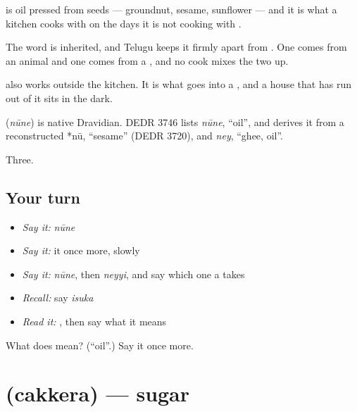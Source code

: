  is oil pressed from seeds — groundnut, sesame, sunflower — and it is what a kitchen cooks with on the days it is not cooking with .

The word is inherited, and Telugu keeps it firmly apart from . One comes from an animal and one comes from a , and no cook mixes the two up.

 also works outside the kitchen. It is what goes into a , and a house that has run out of it sits in the dark.

\begin{cousinweb}
\textbf{} (\emph{nūne}) is native Dravidian. DEDR 3746 lists \emph{nūne}, \textquotedblleft{}oil\textquotedblright{}, and derives it from a reconstructed *nū, \textquotedblleft{}sesame\textquotedblright{} (DEDR 3720), and \emph{ney}, \textquotedblleft{}ghee, oil\textquotedblright{}.
\end{cousinweb}

\begin{grammarlens}[title={What you've built}]
Three.
\end{grammarlens}

\subsection*{Your turn}
\begin{itemize}
\raggedright
  \item \emph{Say it:} \emph{nūne}
  \item \emph{Say it:} it once more, slowly
  \item \emph{Say it:} \emph{nūne}, then \emph{neyyi}, and say which one a  takes
  \item \emph{Recall:} say \emph{isuka}
  \item \emph{Read it:} \textbf{}, then say what it means
\end{itemize}

\begin{tcolorbox}[breakable,colback=teal!4,colframe=teal!35!black,title={Before you move on}]
What does  mean? (\textquotedblleft{}oil\textquotedblright{}.) Say it once more.
\end{tcolorbox}
\section[\texorpdfstring{\te{చక్కెర} (cakkera)}{చక్కెర (cakkera)}]{ (cakkera) — sugar}

